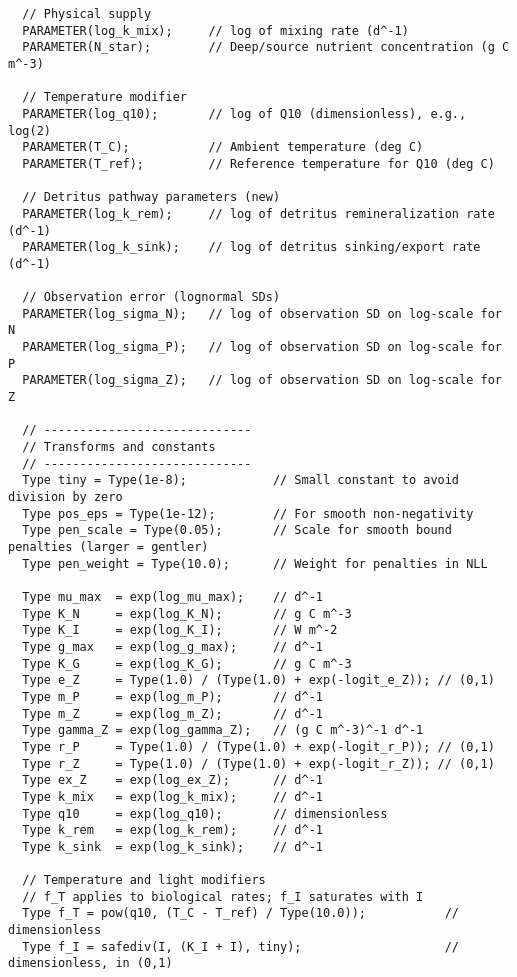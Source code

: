 \begin{lstlisting}
  // Physical supply
  PARAMETER(log_k_mix);     // log of mixing rate (d^-1)
  PARAMETER(N_star);        // Deep/source nutrient concentration (g C m^-3)

  // Temperature modifier
  PARAMETER(log_q10);       // log of Q10 (dimensionless), e.g., log(2)
  PARAMETER(T_C);           // Ambient temperature (deg C)
  PARAMETER(T_ref);         // Reference temperature for Q10 (deg C)

  // Detritus pathway parameters (new)
  PARAMETER(log_k_rem);     // log of detritus remineralization rate (d^-1)
  PARAMETER(log_k_sink);    // log of detritus sinking/export rate (d^-1)

  // Observation error (lognormal SDs)
  PARAMETER(log_sigma_N);   // log of observation SD on log-scale for N
  PARAMETER(log_sigma_P);   // log of observation SD on log-scale for P
  PARAMETER(log_sigma_Z);   // log of observation SD on log-scale for Z

  // -----------------------------
  // Transforms and constants
  // -----------------------------
  Type tiny = Type(1e-8);            // Small constant to avoid division by zero
  Type pos_eps = Type(1e-12);        // For smooth non-negativity
  Type pen_scale = Type(0.05);       // Scale for smooth bound penalties (larger = gentler)
  Type pen_weight = Type(10.0);      // Weight for penalties in NLL

  Type mu_max  = exp(log_mu_max);    // d^-1
  Type K_N     = exp(log_K_N);       // g C m^-3
  Type K_I     = exp(log_K_I);       // W m^-2
  Type g_max   = exp(log_g_max);     // d^-1
  Type K_G     = exp(log_K_G);       // g C m^-3
  Type e_Z     = Type(1.0) / (Type(1.0) + exp(-logit_e_Z)); // (0,1)
  Type m_P     = exp(log_m_P);       // d^-1
  Type m_Z     = exp(log_m_Z);       // d^-1
  Type gamma_Z = exp(log_gamma_Z);   // (g C m^-3)^-1 d^-1
  Type r_P     = Type(1.0) / (Type(1.0) + exp(-logit_r_P)); // (0,1)
  Type r_Z     = Type(1.0) / (Type(1.0) + exp(-logit_r_Z)); // (0,1)
  Type ex_Z    = exp(log_ex_Z);      // d^-1
  Type k_mix   = exp(log_k_mix);     // d^-1
  Type q10     = exp(log_q10);       // dimensionless
  Type k_rem   = exp(log_k_rem);     // d^-1
  Type k_sink  = exp(log_k_sink);    // d^-1

  // Temperature and light modifiers
  // f_T applies to biological rates; f_I saturates with I
  Type f_T = pow(q10, (T_C - T_ref) / Type(10.0));           // dimensionless
  Type f_I = safediv(I, (K_I + I), tiny);                    // dimensionless, in (0,1)


\end{lstlisting}
